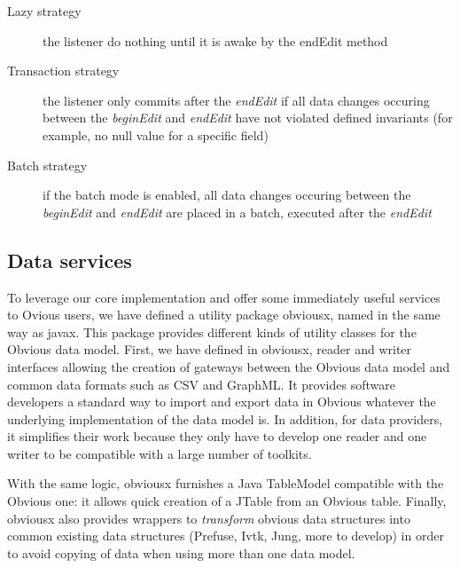 \begin{description}
\item[Lazy strategy] the listener do nothing until it is awake by the endEdit method
\item[Transaction strategy] the listener only commits after the \emph{endEdit} if all data changes occuring between the \emph{beginEdit} and \emph{endEdit} have not violated defined invariants (for example, no null value for a specific field)
\item[Batch strategy] if the batch mode is enabled, all data changes occuring between the \emph{beginEdit} and \emph{endEdit} are placed in a batch, executed after the \emph{endEdit}
\end{description}

\subsection{Data services}

To leverage our core implementation and offer some immediately useful services to Ovious users, we have defined a utility package obviousx, named in the same way as javax. This package provides different kinds of utility classes for the Obvious data model. First, we have defined in obviousx, reader and writer interfaces allowing the creation of gateways between the Obvious data model and common data formats such as CSV and GraphML. It provides software developers a standard way to import and export data in Obvious whatever the underlying implementation of the data model is. In addition, for data providers, it simplifies their work because they only have to develop one reader and one writer to be compatible with a large number of toolkits.

With the same logic, obviousx furnishes a Java TableModel compatible with the Obvious one: it allows quick creation of a JTable from an Obvious
table. Finally, obviousx also provides wrappers to \emph{transform} obvious data structures into common existing data structures (Prefuse, Ivtk, Jung, more to develop) in order to avoid copying of data when using more than one data model.
